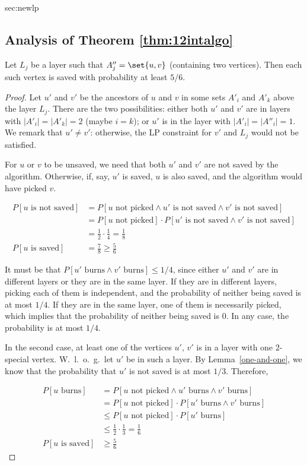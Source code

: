 \begin{appendixextra}{sec:newlp}{\subsection{Analysis of Theorem \ref{thm:12intalgo}}}
\begin{lemma}
Let $L_j$ be a layer such that $A''_j = \set{u,v}$ (containing two vertices). Then each such vertex is saved with probability at least $5/6$. 
\end{lemma}

\begin{proof}

Let $u'$ and $v'$ be the ancestors of $u$ and $v$ in some sets $A'_{i}$ and $A'_k$ above the layer $L_j$.
There are the two possibilities: either both $u'$ and $v'$ are in layers with $|A'_i| = |A'_k| =2$ (maybe $i=k$); or $u'$ is in the layer with $|A'_i| = |A''_i| =1$. We remark that $u' \neq v'$: otherwise, the LP constraint for $v'$ and $L_j$ would not be satisfied.

For $u$ or $v$ to be unsaved, we need that both $u'$ and $v'$ are not saved by the algorithm.  
Otherwise, if, say, $u'$ is saved, $u$ is also saved, and the algorithm would have picked $v$.

\begin{align*}
P[u \text{ is not saved}] &= P[u \text{ not picked} \wedge u' \text{ is not saved} \wedge v' \text{ is not saved}] \\
                   &= P[u \text{ not picked}]\cdot P[u' \text{ is not saved} \wedge v' \text{ is not saved}] \\
                   &= \frac12 \cdot \frac14 
                    = \frac18\\
P[u \text{ is saved}] &=\frac78 \geq \frac56
\end{align*}

It must be that $P[u' \text{ burns} \wedge v' \text{ burns}] \leq 1/4$,
since either $u'$ and $v'$ are in different layers or they are in the same
layer. 
If they are in different layers, picking each of them is independent,
and the probability of neither being saved is at most $1/4$. 
If they are in
the same layer, one of them is necessarily picked, which implies that the
probability of neither being saved is $0$. In any case, the probability is at most $1/4$.

In the second case, at least one of the vertices $u'$, $v'$ is in a layer with one
2-special vertex. W.~l.~o.~g.~let $u'$ be in such a
layer. By Lemma~\ref{one-and-one}, we know that the probability that $u'$
is not saved is at most $1/3$. 
Therefore, 

\begin{align*}
P[u \text{ burns}] &= P[u \text{ not picked} \wedge u' \text{ burns} \wedge v' \text{ burns}] \\
                   &= P[u \text{ not picked}]\cdot P[u' \text{ burns} \wedge v' \text{ burns}] \\
                   &\leq P[u \text{ not picked}]\cdot P[u' \text{ burns}] \\
                   &\leq \frac12 \cdot \frac13 
                    = \frac16\\
P[u \text{ is saved}] &\geq \frac56
\end{align*}


\end{proof}
\end{appendixextra}
